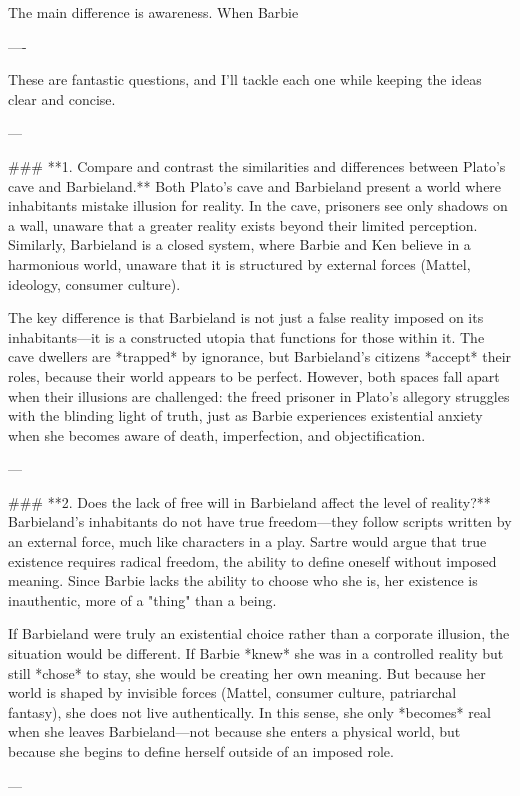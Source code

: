 The main difference is awareness. When Barbie 

----

These are fantastic questions, and I'll tackle each one while keeping the ideas clear and concise.  

---

### **1. Compare and contrast the similarities and differences between Plato's cave and Barbieland.**  
Both Plato’s cave and Barbieland present a world where inhabitants mistake illusion for reality. In the cave, prisoners see only shadows on a wall, unaware that a greater reality exists beyond their limited perception. Similarly, Barbieland is a closed system, where Barbie and Ken believe in a harmonious world, unaware that it is structured by external forces (Mattel, ideology, consumer culture).  

The key difference is that Barbieland is not just a false reality imposed on its inhabitants—it is a constructed utopia that functions for those within it. The cave dwellers are *trapped* by ignorance, but Barbieland’s citizens *accept* their roles, because their world appears to be perfect. However, both spaces fall apart when their illusions are challenged: the freed prisoner in Plato’s allegory struggles with the blinding light of truth, just as Barbie experiences existential anxiety when she becomes aware of death, imperfection, and objectification.  

---

### **2. Does the lack of free will in Barbieland affect the level of reality?**  
Barbieland’s inhabitants do not have true freedom—they follow scripts written by an external force, much like characters in a play. Sartre would argue that true existence requires radical freedom, the ability to define oneself without imposed meaning. Since Barbie lacks the ability to choose who she is, her existence is inauthentic, more of a "thing" than a being.  

If Barbieland were truly an existential choice rather than a corporate illusion, the situation would be different. If Barbie *knew* she was in a controlled reality but still *chose* to stay, she would be creating her own meaning. But because her world is shaped by invisible forces (Mattel, consumer culture, patriarchal fantasy), she does not live authentically. In this sense, she only *becomes* real when she leaves Barbieland—not because she enters a physical world, but because she begins to define herself outside of an imposed role.  

---

